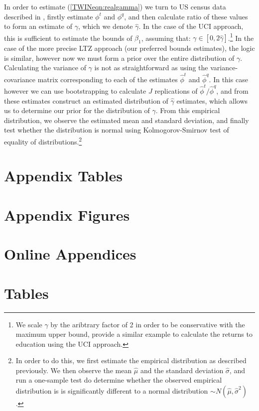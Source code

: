 \documentclass[subeqn]{article}
\begin{document}
\begin{spacing}{1.4}
In order to estimate (\ref{TWINeqn:realgamma}) we turn to US census data described in
\citet{BhalotraVenkataramani2014}, firstly estimate $\phi^t$ and $\phi^q$, and then calculate
ratio of these values to form an estimate of $\gamma$, which we denote $\hat\gamma$.
In the case of the UCI approach, this is sufficient to estimate the bounds of $\beta_1$,
assuming that: $\gamma\in[0,2\hat\gamma]$.\footnote{We scale $\gamma$ by the aribtrary 
factor of 2 in order to be conservative with the maximum upper bound, \citet{Conleyetal2012}
provide a similar example to calculate the returns to education using the UCI approach.}  
In the case of the more precise LTZ approach (our preferred bounds estimates), the logic 
is similar, however now we must form a prior over the entire distribution of $\gamma$.
Calculating the variance of $\gamma$ is not as straightforward as using the 
variance-covariance matrix corresponding to each of the estimates $\hat\phi^t$ and 
$\hat\phi^q$.  In this case however we can use bootstrapping to calculate $J$ 
replications of $\hat\phi^t/\hat\phi^q$, and from these estimates construct an 
estimated distribution of $\hat\gamma$ estimates, which allows us to determine our 
prior for the distribution of $\gamma$.  From this empirical distribution, we observe 
the estimated mean and standard deviation, and finally test whether the distribution is
normal using Kolmogorov-Smirnov test of equality of distributions.\footnote{In order to 
do this, we first estimate the empirical distribution as described previously.  We then 
observe the mean $\hat\mu$ and the standard deviation $\hat\sigma$, and run a one-sample 
test do determine whether the observed empirical distribution is is significantly different
to a normal distribution $\sim N(\hat\mu,\hat\sigma^2)$.}

\newpage
\end{spacing}

\section{Appendix Tables}

\clearpage
\newpage

\section{Appendix Figures}

\clearpage
\newpage

\appendix
\section*{Online Appendices}
\section{Tables}

\end{document}
